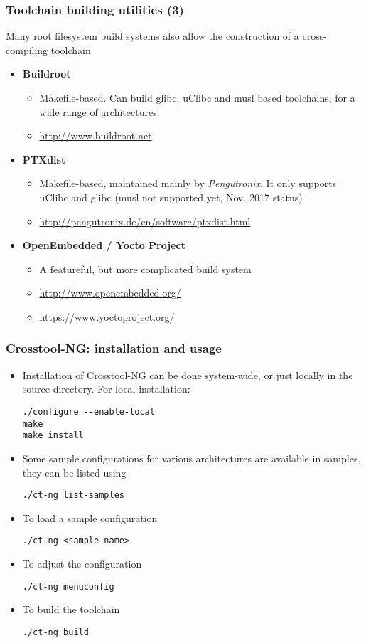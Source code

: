 \begin{frame}
\frametitle{Toolchain building utilities (3)}
Many root filesystem build systems also allow the construction of
a cross-compiling toolchain
\begin{itemize}
\item {\bf Buildroot}
  \begin{itemize}
  \item Makefile-based. Can build glibc, uClibc and musl based
    toolchains, for a wide range of architectures.
  \item \url{http://www.buildroot.net}
  \end{itemize}
\item {\bf PTXdist}
  \begin{itemize}
  \item Makefile-based, maintained mainly by {\em Pengutronix}. It only
        supports uClibc and glibc (musl not supported yet, Nov. 2017 status)
  \item \url{http://pengutronix.de/en/software/ptxdist.html}
  \end{itemize}
\item {\bf OpenEmbedded / Yocto Project}
  \begin{itemize}
  \item A featureful, but more complicated build system
  \item \url{http://www.openembedded.org/}
  \item \url{https://www.yoctoproject.org/}
  \end{itemize}
\end{itemize}
\end{frame}

\begin{frame}[fragile]
  \frametitle{Crosstool-NG: installation and usage}
  \begin{itemize}
  \item Installation of Crosstool-NG can be done system-wide, or just locally in
    the source directory. For local installation:
\begin{verbatim}
./configure --enable-local
make
make install
\end{verbatim}
  \item Some sample configurations for various architectures are
    available in
    samples, they can be listed using
\begin{verbatim}
./ct-ng list-samples
\end{verbatim}
  \item To load a sample configuration
\begin{verbatim}
./ct-ng <sample-name>
\end{verbatim}
  \item To adjust the configuration
\begin{verbatim}
./ct-ng menuconfig
\end{verbatim}
  \item To build the toolchain
\begin{verbatim}
./ct-ng build
\end{verbatim}
  \end{itemize}
\end{frame}

